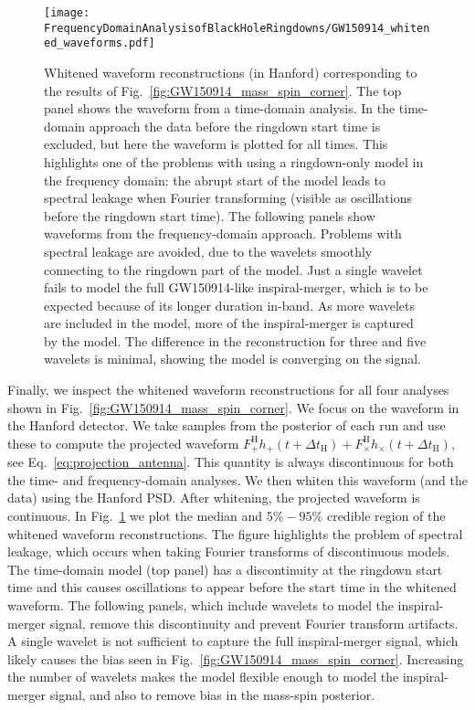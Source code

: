 \begin{figure}[t!]
    \centering
    \texttt{[image: FrequencyDomainAnalysisofBlackHoleRingdowns/GW150914\_whitened\_waveforms.pdf]}
    \caption[Whitened waveform reconstructions (in Hanford) corresponding to the results of Fig.~\ref{fig:GW150914_mass_spin_corner}]{ 
    Whitened waveform reconstructions (in Hanford) corresponding to the results of Fig.~\ref{fig:GW150914_mass_spin_corner}. 
    The top panel shows the waveform from a time-domain analysis. 
    In the time-domain approach the data before the ringdown start time is excluded, but here the waveform is plotted for all times.
    This highlights one of the problems with using a ringdown-only model in the frequency domain: the abrupt start of the model leads to spectral leakage when Fourier transforming (visible as oscillations before the ringdown start time).
    The following panels show waveforms from the frequency-domain approach.
    Problems with spectral leakage are avoided, due to the wavelets smoothly connecting to the ringdown part of the model.
    Just a single wavelet fails to model the full GW150914-like inspiral-merger, which is to be expected because of its longer duration in-band.
    As more wavelets are included in the model, more of the inspiral-merger is captured by the model.
    The difference in the reconstruction for three and five wavelets is minimal, showing the model is converging on the signal.
    }
    \label{fig:GW150914_whitened_waveforms}
\end{figure}

Finally, we inspect the whitened waveform reconstructions for all four analyses shown in Fig.~\ref{fig:GW150914_mass_spin_corner}.
We focus on the waveform in the Hanford detector.
We take samples from the posterior of each run and use these to compute the projected waveform $F^\mathrm{H}_{+} h_+(t+\Delta t_\mathrm{H})+F^\mathrm{H}_{\times} h_\times(t+\Delta t_\mathrm{H})$, see Eq.~\ref{eq:projection_antenna}. This quantity is always discontinuous for both the time- and frequency-domain analyses.
We then whiten this waveform (and the data) using the Hanford PSD. After whitening, the projected waveform is continuous.
In Fig.~\ref{fig:GW150914_whitened_waveforms} we plot the median and $5\%-95\%$ credible region of the whitened waveform reconstructions.
The figure highlights the problem of spectral leakage, which occurs when taking Fourier transforms of discontinuous models. 
The time-domain model (top panel) has a discontinuity at the ringdown start time and this causes oscillations to appear before the start time in the whitened waveform.
The following panels, which include wavelets to model the inspiral-merger signal, remove this discontinuity and prevent Fourier transform artifacts.
A single wavelet is not sufficient to capture the full inspiral-merger signal, which likely causes the bias seen in Fig.~\ref{fig:GW150914_mass_spin_corner}. 
Increasing the number of wavelets makes the model flexible enough to model the inspiral-merger signal, and also to remove bias in the mass-spin posterior.



